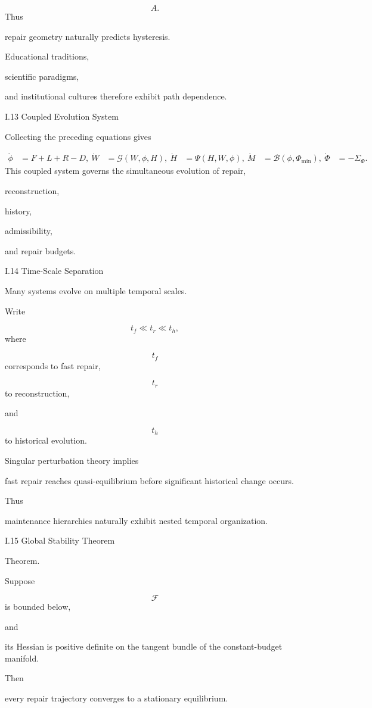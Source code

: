 \documentclass[12pt,oneside]{article}
\theoremstyle{plain}
\theoremstyle{definition}
\theoremstyle{remark}
\begin{document}
\[
A.
\]
Thus

repair geometry naturally predicts hysteresis.

Educational traditions,

scientific paradigms,

and institutional cultures therefore exhibit path dependence.


I.13 Coupled Evolution System

Collecting the preceding equations gives

\[
\begin{aligned}
\dot\phi
&=
F+L+R-D,\
\dot W
&=
\mathcal G(W,\phi,H),\
\dot H
&=
\Psi(H,W,\phi),\
\dot M
&=
\mathcal B(\phi,\Phi_{\min}),\
\dot\Phi
&=
-\Sigma_\Phi.
\end{aligned}
\]
This coupled system governs the simultaneous evolution of repair,

reconstruction,

history,

admissibility,

and repair budgets.


I.14 Time-Scale Separation

Many systems evolve on multiple temporal scales.

Write

\[
t_f
\ll
t_r
\ll
t_h,
\]
where

\[
t_f
\]
corresponds to fast repair,

\[
t_r
\]
to reconstruction,

and

\[
t_h
\]
to historical evolution.

Singular perturbation theory implies

fast repair reaches quasi-equilibrium before significant historical change occurs.

Thus

maintenance hierarchies naturally exhibit nested temporal organization.


I.15 Global Stability Theorem

Theorem.

Suppose

\[
\mathcal F
\]
is bounded below,

and

its Hessian is positive definite on the tangent bundle of the constant-budget manifold.

Then

every repair trajectory converges to a stationary equilibrium.
\end{document}
